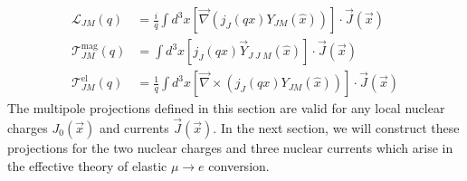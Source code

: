 \documentclass{book}[letterpaper,12pt]
\begin{document}
\begin{equation}
\begin{split}
\mathcal{L}_{JM}(q)&=\frac{i}{q}\int d^3x \left[\vec{\nabla}\left(j_J(qx)Y_{JM}(\hat{x})\right)\right]\cdot\vec{J}(\vec{x})\\
\mathcal{T}^{\mathrm{mag}}_{JM}(q)&=\int d^3x\left[j_J(qx)\vec{Y}_{J\;J\;M}(\hat{x})\right]\cdot\vec{J}(\vec{x})\\
\mathcal{T}^{\mathrm{el}}_{JM}(q)&=\frac{1}{q}\int d^3x\left[\vec{\nabla}\times\left(j_J(qx)Y_{JM}(\hat{x})\right)\right]\cdot\vec{J}(\vec{x})
\end{split}
\end{equation}
The multipole projections defined in this section are valid for any local nuclear charges $J_0(\vec{x})$ and currents $\vec{J}(\vec{x})$. In the next section, we will construct these projections for the two nuclear charges and three nuclear currents which arise in the effective theory of elastic $\mu\rightarrow e$ conversion.

\end{document}
